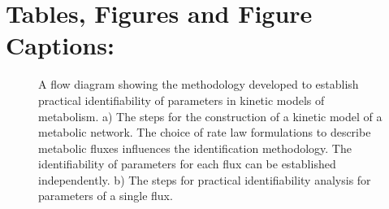 \documentclass[10pt]{article}
\begin{document}
	\printbibliography
	
	\clearpage
	\section{Tables, Figures and Figure Captions:}
	\begin{figure}[!tbhp]
		\caption{A flow diagram showing the methodology developed to establish practical identifiability of parameters in kinetic models of metabolism. a) The steps for the construction of a kinetic model of a metabolic network. The choice of rate law formulations to describe metabolic fluxes influences the identification methodology. The identifiability of parameters for each flux can be established independently. b) The steps for practical identifiability analysis for parameters of a single flux.}\label{fig:ident-flowchart}
	\end{figure}	
	
\end{document}
